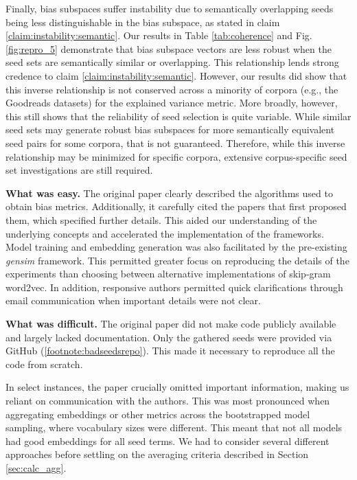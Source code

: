 Finally, bias subspaces suffer instability due to semantically overlapping seeds being less
distinguishable in the bias subspace, as stated in claim \ref{claim:instability:semantic}. Our
results in Table \ref{tab:coherence} and Fig. \ref{fig:repro_5} demonstrate that bias subspace
vectors are less robust when the seed sets are semantically similar or overlapping. This
relationship lends strong credence to claim \ref{claim:instability:semantic}. However, our results
did show that this inverse relationship is not conserved across a minority of corpora (e.g., the
Goodreads datasets) for the explained variance metric. More broadly, however, this still shows that
the reliability of seed selection is quite variable. While similar seed sets may generate robust
bias subspaces for more semantically equivalent seed pairs for some corpora, that is not guaranteed.
Therefore, while this inverse relationship may be minimized for specific corpora, extensive
corpus-specific seed set investigations are still required.

\textbf{What was easy.} The original paper clearly described the algorithms used to obtain bias
metrics. Additionally, it carefully cited the papers that first proposed them, which specified
further details. This aided our understanding of the underlying concepts and accelerated the
implementation of the frameworks. Model training and embedding generation was also facilitated by
the pre-existing \emph{gensim} framework. This permitted greater focus on reproducing the details of
the experiments than choosing between alternative implementations of skip-gram word2vec. In
addition, responsive authors permitted quick clarifications through email communication when
important details were not clear.

\textbf{What was difficult.} The original paper did not make code publicly available and largely
lacked documentation. Only the gathered seeds were provided via GitHub
(\ref{footnote:badseedsrepo}). This made it necessary to reproduce all the code from scratch.

In select instances, the paper crucially omitted important information, making us reliant on
communication with the authors. This was most pronounced when aggregating embeddings or other
metrics across the bootstrapped model sampling, where vocabulary sizes were different. This meant
that not all models had good embeddings for all seed terms. We had to consider several different
approaches before settling on the averaging criteria described in Section \ref{sec:calc_agg}.


